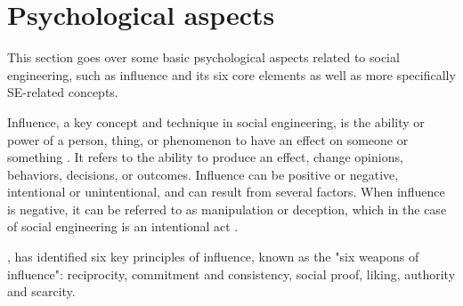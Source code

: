 
\section{Psychological aspects}
\begin{comment}

    - Influence
        - Six Weapons of Influence
            - Reciprocity
            - Commitment and consistency
            - Social proof
            - Liking
            - Authority
            - Scarcity
        - Cialdini Influence Science and Practice 1993
    - Hatfield's three concepts
        - Epistemic asymmetry
        - Technocratic dominance
        - Teleological replacement
        
\end{comment}

This section goes over some basic psychological aspects related to social engineering, such as influence and its six core elements as well as more specifically SE-related concepts.

Influence, a key concept and technique in social engineering, is the ability or power of a person, thing, or phenomenon to have an effect on someone or something \citep{cialdiniInfluenceSciencePractice1993}. It refers to the ability to produce an effect, change opinions, behaviors, decisions, or outcomes. Influence can be positive or negative, intentional or unintentional, and can result from several factors. When influence is negative, it can be referred to as manipulation or deception, which in the case of social engineering is an intentional act \citep{mitnickArtDeceptionControlling2003}.

\cite{cialdiniInfluenceSciencePractice1993}, has identified six key principles of influence, known as the "six weapons of influence": reciprocity, commitment and consistency, social proof, liking, authority and scarcity.

